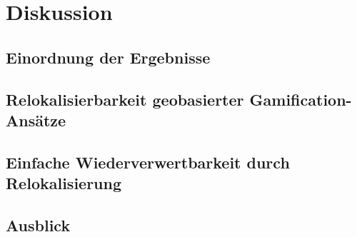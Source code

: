 \section{Diskussion}
\label{sec:S7_Diskussion}

\subsection{Einordnung der Ergebnisse}

\subsection{Relokalisierbarkeit geobasierter Gamification-Ansätze}

\subsection{Einfache Wiederverwertbarkeit durch Relokalisierung}

\subsection{Ausblick}